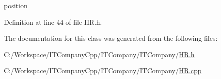 position 



Definition at line 44 of file H\+R.\+h.



The documentation for this class was generated from the following files\+:\begin{DoxyCompactItemize}
\item 
C\+:/\+Workspace/\+I\+T\+Company\+Cpp/\+I\+T\+Company/\+I\+T\+Company/\hyperlink{_h_r_8h}{H\+R.\+h}\item 
C\+:/\+Workspace/\+I\+T\+Company\+Cpp/\+I\+T\+Company/\+I\+T\+Company/\hyperlink{_h_r_8cpp}{H\+R.\+cpp}\end{DoxyCompactItemize}
